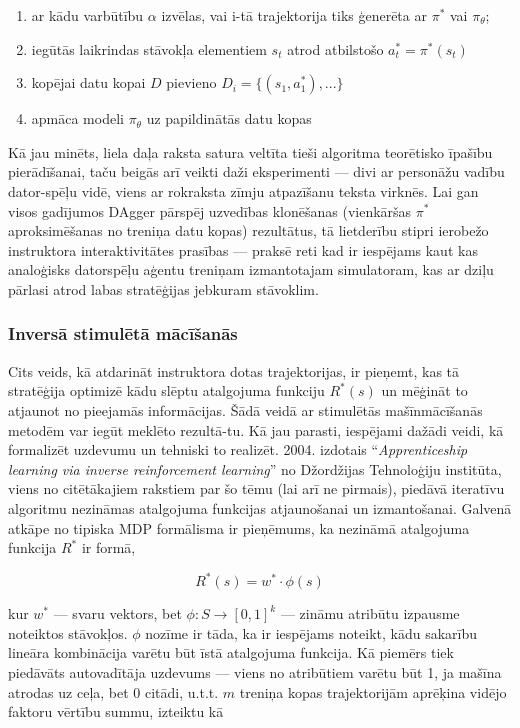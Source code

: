 \documentclass[12pt, a4paper]{article}
\numberwithin{equation}{section} %
\begin{document}
\begin{enumerate}
    \item ar kādu varbūtību $\alpha$ izvēlas, vai i-tā trajektorija tiks ģenerēta ar $\pi^*$ vai $\pi_{\theta}$;
    \item iegūtās laikrindas stāvokļa elementiem $s_t$ atrod atbilstošo $a^*_t=\pi^*(s_t)$ 
    \item kopējai datu kopai $D$ pievieno $D_i=\lbrace (s_1, a^*_1),... \rbrace$
    \item apmāca modeli $\pi_{\theta}$ uz papildinātās datu kopas
\end{enumerate}

Kā jau minēts, liela daļa raksta satura veltīta tieši algoritma teorētisko īpašību pierādīšanai, taču beigās arī veikti daži eksperimenti --- divi ar personāžu vadību dator-spēļu vidē, viens ar rokraksta zīmju atpazīšanu teksta virknēs. Lai gan visos gadījumos DAgger pārspēj uzvedības klonēšanas (vienkāršas $\pi^*$ aproksimēšanas no treniņa datu kopas) rezultātus, tā lietderību stipri ierobežo instruktora interaktivitātes prasības --- praksē reti kad ir iespējams kaut kas analoģisks datorspēļu aģentu treniņam izmantotajam simulatoram, kas ar dziļu pārlasi atrod labas stratēģijas jebkuram stāvoklim.

\subsubsection{Inversā stimulētā mācīšanās}

Cits veids, kā atdarināt instruktora dotas trajektorijas, ir pieņemt, kas tā stratēģija optimizē kādu slēptu atalgojuma funkciju $R^*(s)$ un mēģināt to atjaunot no pieejamās informācijas. Šādā veidā ar stimulētās mašīnmācīšanās metodēm var iegūt meklēto rezultā-tu. Kā jau parasti, iespējami dažādi veidi, kā formalizēt uzdevumu un tehniski to realizēt. 2004. izdotais ``\textit{Apprenticeship learning via inverse reinforcement learning}'' \cite{abbeel2004apprenticeship} no Džordžijas Tehnoloģiju institūta, viens no citētākajiem rakstiem par šo tēmu (lai arī ne pirmais), piedāvā iteratīvu algoritmu nezināmas atalgojuma funkcijas atjaunošanai un izmantošanai. Galvenā atkāpe no tipiska MDP formālisma ir pieņēmums, ka nezināmā atalgojuma funkcija $R^*$ ir formā, 

\begin{equation}
    R^*(s) = w^* \cdot \phi(s)
\end{equation}

kur $w^*$ --- svaru vektors, bet $\phi: S \rightarrow [0,1]^k$ --- zināmu atribūtu izpausme noteiktos stāvokļos. $\phi$ nozīme ir tāda, ka ir iespējams noteikt, kādu sakarību lineāra kombinācija varētu būt īstā atalgojuma funkcija. Kā piemērs tiek piedāvāts autovadītāja uzdevums --- viens no atribūtiem varētu būt 1, ja mašīna atrodas uz ceļa, bet 0 citādi, u.t.t. $m$ treniņa kopas trajektorijām aprēķina vidējo faktoru vērtību summu, izteiktu kā
\end{document}

